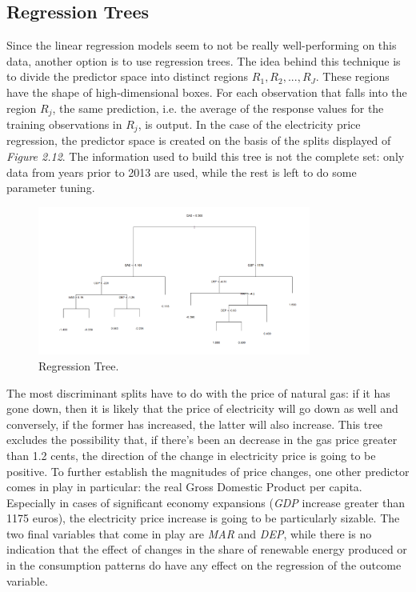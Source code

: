 \documentclass{book}
\begin{document}
\subsection{Regression Trees}

Since the linear regression models seem to not be really well-performing on this data, another option is to use regression trees. The idea behind this technique is to divide the predictor space into distinct regions $R_1, R_2, ..., R_J$. These regions have the shape of high-dimensional boxes. For each observation that falls into the region $R_j$, the same prediction, i.e. the average of the response values for the training observations in $R_j$, is output. In the case of the electricity price regression, the predictor space is created on the basis of the splits displayed of \textit{Figure 2.12}. The information used to build this tree is not the complete set: only data from years prior to 2013 are used, while the rest is left to do some parameter tuning.
 
\bigskip
\begin{figure}[H]
\begin{center}
\captionsetup{justification=centering}
\includegraphics[width=0.8\textwidth]{Images/plot.png}
\caption{Regression Tree.}
\end{center}
\end{figure}
\bigskip

The most discriminant splits have to do with the price of natural gas: if it has gone down, then it is likely that the price of electricity will go down as well and conversely, if the former has increased, the latter will also increase. This tree excludes the possibility that, if there's been an decrease in the gas price greater than 1.2 cents, the direction of the change in electricity price is going to be positive. To further establish the magnitudes of price changes, one other predictor comes in play in particular: the real Gross Domestic Product per capita. Especially in cases of significant economy expansions (\textit{GDP} increase greater than 1175 euros), the electricity price increase is going to be particularly sizable. The two final variables that come in play are \textit{MAR} and \textit{DEP}, while there is no indication that the effect of changes in the share of renewable energy produced or in the consumption patterns do have any effect on the regression of the outcome variable.\\
\end{document}
